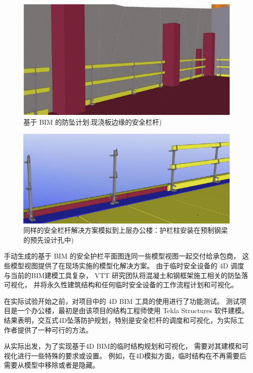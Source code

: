 \begin{figure}[thbp!]
    \centering
    \includegraphics[width=1.0\linewidth]{res/c4f2.png}
    \caption{基于 BIM 的防坠计划:现浇板边缘的安全栏杆)}
    \label{fig:c4f2}
\end{figure}

\begin{figure}[thbp!]
    \centering
    \includegraphics[width=1.0\linewidth]{res/c4f3.png}
    \caption{同样的安全栏杆解决方案模拟到上层办公楼：护栏柱安装在预制钢梁的预先设计孔中)}
    \label{fig:c4f3}
\end{figure}

手动生成的基于 BIM 的安全护栏平面图连同一些模型视图一起交付给承包商，
这些模型视图提供了在现场实施的模型化解决方案。
由于临时安全设备的 4D 调度与当前的BIM建模工具复杂，
VTT 研究团队将混凝土和钢框架施工相关的防坠落可视化，
并将永久性建筑结构和任何临时安全设备的工作流程计划和可视化。

在实际试验开始之前，对项目中的 4D BIM 工具的使用进行了功能测试。
测试项目是一个办公楼，最初是由该项目的结构工程师使用 Tekla Structures 软件建模。
结果表明，交互式4D坠落防护规划，特别是安全栏杆的调度和可视化，为实际工作者提供了一种可行的方法。

从实际出发，为了实现基于4D BIM的临时结构规划和可视化，
需要对其建模和可视化进行一些特殊的要求或设置。
例如，在4D模拟方面，临时结构在不再需要后需要从模型中移除或者是隐藏。\\

